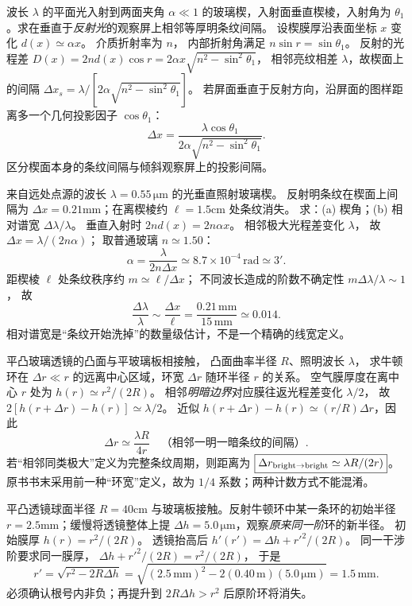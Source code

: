 波长 $\lambda$ 的平面光入射到两面夹角 $\alpha\ll1$ 的玻璃楔，入射面垂直楔棱，入射角为 $\theta_1$。求在垂直于\emph{反射光}的观察屏上相邻等厚明条纹间隔。
\exsolution
设楔膜厚沿表面坐标 $x$ 变化
$d(x)\simeq\alpha x$。
介质折射率为 $n$，
内部折射角满足
$n\sin r=\sin\theta_1$。
反射的光程差
$D(x)=2nd(x)\cos r
=2\alpha x\sqrt{n^2-\sin^2\theta_1}$，
相邻亮纹相差 $\lambda$，故楔面上的间隔
$\Delta x_s=\lambda/
[2\alpha\sqrt{n^2-\sin^2\theta_1}]$。
若屏面垂直于反射方向，沿屏面的图样距离多一个几何投影因子
$\cos\theta_1$：
\[
\boxed{\Delta x=
\frac{\lambda\cos\theta_1}
{2\alpha\sqrt{n^2-\sin^2\theta_1}}}.
\]
\excheck 区分楔面本身的条纹间隔与倾斜观察屏上的投影间隔。

来自远处点源的波长
$\lambda=0.55\,\mathrm{\mu m}$ 的光垂直照射玻璃楔。
反射明条纹在楔面上间隔为
$\Delta x=0.21$mm；在离楔棱约
$\ell=1.5$cm 处条纹消失。
求：(a) 楔角；(b) 相对谱宽 $\Delta\lambda/\lambda$。
\exsolution
垂直入射时
$2nd(x)=2n\alpha x$。
相邻极大光程差变化 $\lambda$，
故 $\Delta x=\lambda/(2n\alpha)$；
取普通玻璃 $n\simeq1.50$：
\[
\boxed{\alpha=\frac{\lambda}{2n\Delta x}
\simeq8.7\times10^{-4}\,\mathrm{rad}
\simeq3'}.
\]
距楔棱 $\ell$ 处条纹秩序约
$m\simeq\ell/\Delta x$；
不同波长造成的阶数不确定性
$m\Delta\lambda/\lambda\sim1$，
故
\[
\boxed{\frac{\Delta\lambda}{\lambda}
\sim\frac{\Delta x}{\ell}
=\frac{0.21\,\mathrm{mm}}{15\,\mathrm{mm}}
\simeq0.014}.
\]
\excheck 相对谱宽是“条纹开始洗掉”的数量级估计，不是一个精确的线宽定义。

平凸玻璃透镜的凸面与平玻璃板相接触，
凸面曲率半径 $R$、照明波长 $\lambda$，
求牛顿环在 $\Delta r\ll r$ 的远离中心区域，环宽
$\Delta r$ 随环半径 $r$ 的关系。
\exsolution
空气膜厚度在离中心 $r$ 处为
$h(r)\simeq r^2/(2R)$。
相邻\emph{明暗边界}对应膜往返光程差变化 $\lambda/2$，
故
$2[h(r+\Delta r)-h(r)]\simeq\lambda/2$。
近似
$h(r+\Delta r)-h(r)\simeq(r/R)\Delta r$，因此
\[
\boxed{\Delta r\simeq\frac{\lambda R}{4r}}
\quad\text{（相邻一明一暗条纹的间隔）}.
\]
若“相邻同类极大”定义为完整条纹周期，则距离为
$\boxed{\Delta r_{\rm bright\to bright}\simeq\lambda R/(2r)}$。
\excheck 原书书末采用前一种“环宽”定义，故为 $1/4$ 系数；两种计数方式不能混淆。

平凸透镜球面半径 $R=40$cm 与玻璃板接触。反射牛顿环中某一条环的初始半径
$r=2.5$mm；缓慢将透镜整体上提
$\Delta h=5.0\,\mathrm{\mu m}$，观察\emph{原来同一阶}环的新半径。
\exsolution
初始膜厚
$h(r)=r^2/(2R)$。
透镜抬高后
$h'(r')=\Delta h+r'^2/(2R)$。
同一干涉阶要求同一膜厚，
$\Delta h+r'^2/(2R)=r^2/(2R)$，
于是
\[
\boxed{r'=\sqrt{r^2-2R\Delta h}}
=\sqrt{(2.5\,\mathrm{mm})^2-
2(0.40\,\mathrm m)(5.0\,\mathrm{\mu m})}
=\boxed{1.5\,\mathrm{mm}}.
\]
\excheck 必须确认根号内非负；再提升到 $2R\Delta h>r^2$ 后原阶环将消失。

